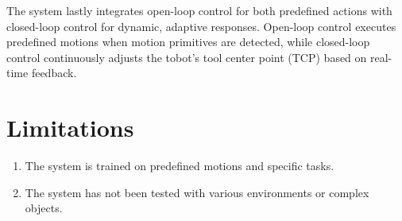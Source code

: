 \documentclass{article}
\begin{document}
The system lastly integrates open-loop control for both predefined actions with closed-loop control for dynamic, adaptive responses. Open-loop control executes predefined motions when motion primitives are detected, while closed-loop control continuously adjusts the tobot's tool center point (TCP) based on real-time feedback.

\section*{Limitations}

\begin{enumerate}
    \item The system is trained on predefined motions and specific tasks.
    \item The system has not been tested with various environments or complex objects.
\end{enumerate}
\end{document}
